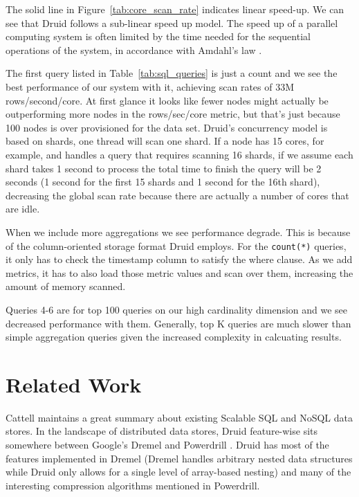 \documentclass{vldb}
\begin{document}

The solid line in Figure~\ref{tab:core_scan_rate} indicates linear speed-up. We can see that Druid
follows a sub-linear speed up model. The speed up of a parallel computing system is often limited
by the time needed for the sequential operations of the system, in accordance with Amdahl's law \cite{amdahl1967validity}.

The first query listed in Table~\ref{tab:sql_queries} is just a count and we see the best
performance of our system with it, achieving scan rates of 33M
rows/second/core. At first glance it looks like fewer nodes might
actually be outperforming more nodes in the rows/sec/core metric, but
that's just because 100 nodes is over provisioned for the data set.
Druid's concurrency model is based on shards, one thread will scan one
shard. If a node has 15 cores, for example, and handles a query that
requires scanning 16 shards, if we assume each shard takes 1 second to
process the total time to finish the query will be 2 seconds (1 second
for the first 15 shards and 1 second for the 16th shard), decreasing
the global scan rate because there are actually a number of cores that
are idle.

When we include more aggregations we see performance degrade.  This is
because of the column-oriented storage format Druid employs.  For the
\texttt{count(*)} queries, it only has to check the timestamp column to satisfy
the where clause.  As we add metrics, it has to also load those metric
values and scan over them, increasing the amount of memory scanned.

Queries 4-6 are for top 100 queries on our high cardinality dimension and we see decreased performance with them.
Generally, top K queries are much slower than simple aggregation queries given the increased complexity in calcuating results.

\section{Related Work}
\label{sec:related}
Cattell \cite{cattell2011scalable} maintains a great summary about existing Scalable SQL and
NoSQL data stores. In the landscape of distributed data stores, Druid
feature-wise sits somewhere between Google’s Dremel \cite{melnik2010dremel} and Powerdrill
\cite{hall2012processing}. Druid has most of the features implemented in Dremel (Dremel
handles arbitrary nested data structures while Druid only allows for a
single level of array-based nesting) and many of the interesting
compression algorithms mentioned in Powerdrill.
\end{document}
